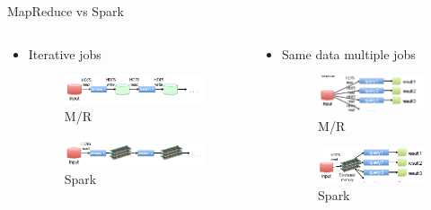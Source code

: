 \documentclass[presentation, aspectratio=169]{beamer}
\begin{document}
\begin{frame}[label={sec:orgf4c6ded}]{MapReduce vs Spark}
\begin{columns}
\begin{column}{0.5\columnwidth}
\begin{itemize}
\item Iterative jobs
\begin{figure}[htbp]
\centering
\includegraphics[width=.9\linewidth]{./img/mr-iterative.png}
\caption{\label{fig:org406c680}M/R}
\end{figure}
\begin{figure}[htbp]
\centering
\includegraphics[width=.9\linewidth]{./img/spark-iterative.png}
\caption{\label{fig:org2ea235d}Spark}
\end{figure}
\end{itemize}
\end{column}

\begin{column}{0.5\columnwidth}
\begin{itemize}
\item Same data multiple jobs
\begin{figure}[htbp]
\centering
\includegraphics[width=.9\linewidth]{./img/map-multiple.png}
\caption{\label{fig:org8ecfda4}M/R}
\end{figure}
\begin{figure}[htbp]
\centering
\includegraphics[width=.9\linewidth]{./img/spark-multiple.png}
\caption{\label{fig:org7a91d77}Spark}
\end{figure}
\end{itemize}
\end{column}
\end{columns}
\end{frame}
\end{document}
